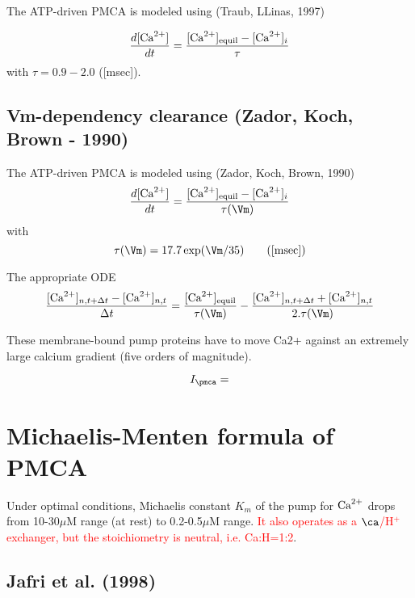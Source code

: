 The ATP-driven PMCA is modeled using (Traub, LLinas, 1997)

\def\equil{{\text{equil}}}
\def\msec{{\text{msec}}}
\begin{equation}
\frac{d[\Ca]}{dt} = \frac{[\Ca]_\equil - [\Ca]_i}{\tau}
\end{equation}
with $\tau=0.9-2.0$ ([msec]).

\subsection{Vm-dependency clearance (Zador, Koch, Brown - 1990)}
\label{sec:PMCA-Vm-dependent-clearance-rate}

The ATP-driven PMCA is modeled using (Zador, Koch, Brown, 1990)
\def\equil{{\text{equil}}}
\def\msec{{\text{msec}}}
\begin{equation}
\frac{d[\Ca]}{dt} = \frac{[\Ca]_\equil - [\Ca]_i}{\tau(\Vm)}
\end{equation}
with
\begin{equation}
\tau(\Vm) = 17.7 \exp (\Vm/35) \qquad ([\msec])
\end{equation}

The appropriate ODE
\begin{equation}
\frac{[\Ca]_{n,t+\Delta t} - [\Ca]_{n,t}}{\Delta t} = 
\frac{[\Ca]_\equil}{\tau(\Vm)} - 
\frac{[\Ca]_{n,t+\Delta t} + [\Ca]_{n,t}}{2.\tau(\Vm)}
\end{equation}

These membrane-bound pump proteins have to move Ca2+ against an extremely large
calcium gradient (five orders of magnitude).

\begin{equation}
I_\pmca = 
\end{equation}

\section{Michaelis-Menten formula of PMCA}

Under optimal conditions, Michaelis constant $K_m$ of the pump for ${\text{Ca}^{2+}}$ drops
from 10-30$\mu$M range (at rest) to 0.2-0.5$\mu$M range.
\textcolor{red}{It also operates as a $\ca$/H$^+$ exchanger, but the
stoichiometry is neutral, i.e. Ca:H=1:2}.

\subsection{Jafri et al. (1998)}
\label{sec:winslow-et-al-1}

